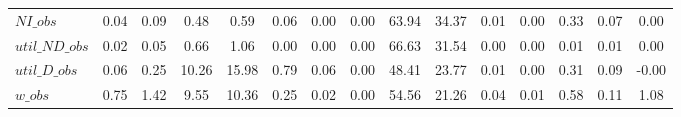 \begin{center}
\begin{longtable}{lcccccccccccccc}
$NI\_obs        $	 & 	            0.04	 & 	            0.09	 & 	            0.48	 & 	            0.59	 & 	            0.06	 & 	            0.00	 & 	            0.00	 & 	           63.94	 & 	           34.37	 & 	            0.01	 & 	            0.00	 & 	            0.33	 & 	            0.07	 & 	            0.00 \\ 
$util\_ND\_obs  $	 & 	            0.02	 & 	            0.05	 & 	            0.66	 & 	            1.06	 & 	            0.00	 & 	            0.00	 & 	            0.00	 & 	           66.63	 & 	           31.54	 & 	            0.00	 & 	            0.00	 & 	            0.01	 & 	            0.01	 & 	            0.00 \\ 
$util\_D\_obs   $	 & 	            0.06	 & 	            0.25	 & 	           10.26	 & 	           15.98	 & 	            0.79	 & 	            0.06	 & 	            0.00	 & 	           48.41	 & 	           23.77	 & 	            0.01	 & 	            0.00	 & 	            0.31	 & 	            0.09	 & 	           -0.00 \\ 
$w\_obs         $	 & 	            0.75	 & 	            1.42	 & 	            9.55	 & 	           10.36	 & 	            0.25	 & 	            0.02	 & 	            0.00	 & 	           54.56	 & 	           21.26	 & 	            0.04	 & 	            0.01	 & 	            0.58	 & 	            0.11	 & 	            1.08 \\ 
\end{longtable}
 \end{center}

